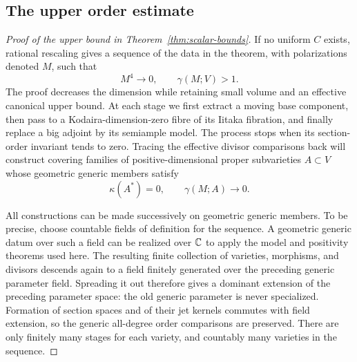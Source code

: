 \subsection{The upper order estimate}

\begin{proof}[Proof of the upper bound in Theorem~\ref{thm:scalar-bounds}]
If no uniform $C$ exists, rational rescaling gives a sequence of the
data in the theorem, with polarizations denoted $M$, such that
\begin{equation}\label{eq:scalar-small-volume}
 M^4\longrightarrow0,
 \qquad \gamma(M;V)>1.
\end{equation}
The proof decreases the dimension while retaining small volume and
an effective canonical upper bound. At each stage we first extract a
moving base component, then pass to a Kodaira-dimension-zero fibre of
its Iitaka fibration, and finally replace a big adjoint by its semiample
model. The process stops when its section-order invariant tends to zero.
Tracing the effective divisor comparisons back will construct covering
families of positive-dimensional proper subvarieties $A\subset V$ whose
geometric generic members satisfy
\begin{equation}\label{eq:scalar-small-zero-members}
 \kappa(A^*)=0,
 \qquad \gamma(M;A)\longrightarrow0.
\end{equation}

All constructions can be made successively on geometric generic
members.  To be precise, choose countable fields of definition for
the sequence.  A geometric generic datum over such a field can be
realized over $\mathbb C$ to apply the model and positivity theorems used here.
The resulting finite collection of varieties, morphisms, and divisors
descends again to a field finitely generated over the preceding
generic parameter field.  Spreading it out therefore gives a dominant
extension of the preceding parameter space: the old generic parameter
is never specialized.  Formation of section spaces and of their jet
kernels commutes with field extension, so the generic all-degree order
comparisons are preserved.  There are only finitely many stages for
each variety, and countably many varieties in the sequence.


\end{proof}
